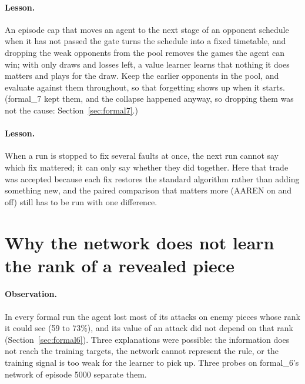 \paragraph{Lesson.} An episode cap that moves an agent to the next stage of an opponent schedule
when it has not passed the gate turns the schedule into a fixed timetable, and dropping the weak
opponents from the pool removes the games the agent can win; with only draws and losses left, a
value learner learns that nothing it does matters and plays for the draw. Keep the earlier
opponents in the pool, and evaluate against them throughout, so that forgetting shows up when it
starts. (formal\_7 kept them, and the collapse happened anyway, so dropping them was not the cause:
Section~\ref{sec:formal7}.)

\paragraph{Lesson.} When a run is stopped to fix several faults at once, the next run cannot say
which fix mattered; it can only say whether they did together. Here that trade was accepted
because each fix restores the standard algorithm rather than adding something new, and the
paired comparison that matters more (AAREN on and off) still has to be run with one difference.

\section{Why the network does not learn the rank of a revealed piece}
\label{sec:revealed-signal}

\paragraph{Observation.} In every formal run the agent lost most of its attacks on enemy pieces
whose rank it could see (59 to 73\%), and its value of an attack did not depend on that rank
(Section~\ref{sec:formal6}). Three explanations were possible: the information does not reach
the training targets, the network cannot represent the rule, or the training signal is too weak
for the learner to pick up. Three probes on formal\_6's network of episode 5000 separate them.

